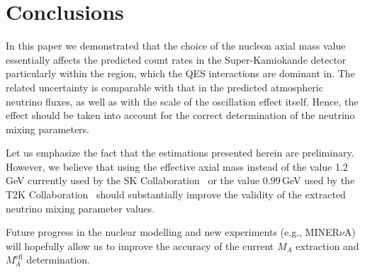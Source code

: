 \section{Conclusions}
In this paper we demonstrated that the choice of the nucleon axial mass value essentially affects the predicted count rates in the Super-Kamiokande detector particularly within the region, which the QES interactions are dominant in. The related uncertainty is comparable with that in the predicted atmospheric neutrino fluxes, as well as with the scale of the oscillation effect itself. Hence, the effect should be taken into account for the correct determination of the neutrino mixing parameters. 

Let us emphasize the fact that the estimations presented herein are preliminary. However, we believe that using the effective axial mass instead of the value 1.2\,GeV currently used by the SK Collaboration~\cite{Wendell:2010md} or the value $0.99$\,GeV used by the T2K Collaboration~\cite{Abe:2011ks} should substantially improve the validity of the extracted neutrino mixing parameter values.

Future progress in the nuclear modelling and new experiments (e.g., MINER$\nu$A) will hopefully allow us to improve the accuracy of the current $M_A$ extraction and $M_{A}^{\mathrm{eff}}$ determination.
